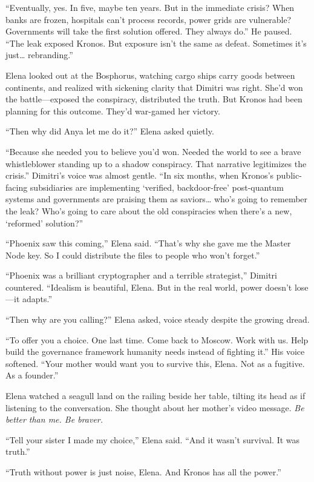 \documentclass[12pt,letterpaper]{book}
\begin{document}
``Eventually, yes. In five, maybe ten years. But in the immediate crisis? When banks are frozen, hospitals can't process records, power grids are vulnerable? Governments will take the first solution offered. They always do.'' He paused. ``The leak exposed Kronos. But exposure isn't the same as defeat. Sometimes it's just\ldots{} rebranding.''

Elena looked out at the Bosphorus, watching cargo ships carry goods between continents, and realized with sickening clarity that Dimitri was right. She'd won the battle---exposed the conspiracy, distributed the truth. But Kronos had been planning for this outcome. They'd war-gamed her victory.

``Then why did Anya let me do it?'' Elena asked quietly.

``Because she needed you to believe you'd won. Needed the world to see a brave whistleblower standing up to a shadow conspiracy. That narrative legitimizes the crisis.'' Dimitri's voice was almost gentle. ``In six months, when Kronos's public-facing subsidiaries are implementing `verified, backdoor-free' post-quantum systems and governments are praising them as saviors\ldots{} who's going to remember the leak? Who's going to care about the old conspiracies when there's a new, `reformed' solution?''

``Phoenix saw this coming,'' Elena said. ``That's why she gave me the Master Node key. So I could distribute the files to people who won't forget.''

``Phoenix was a brilliant cryptographer and a terrible strategist,'' Dimitri countered. ``Idealism is beautiful, Elena. But in the real world, power doesn't lose---it adapts.''

``Then why are you calling?'' Elena asked, voice steady despite the growing dread.

``To offer you a choice. One last time. Come back to Moscow. Work with us. Help build the governance framework humanity needs instead of fighting it.'' His voice softened. ``Your mother would want you to survive this, Elena. Not as a fugitive. As a founder.''

Elena watched a seagull land on the railing beside her table, tilting its head as if listening to the conversation. She thought about her mother's video message. \emph{Be better than me. Be braver.}

``Tell your sister I made my choice,'' Elena said. ``And it wasn't survival. It was truth.''

``Truth without power is just noise, Elena. And Kronos has all the power.''
\end{document}
